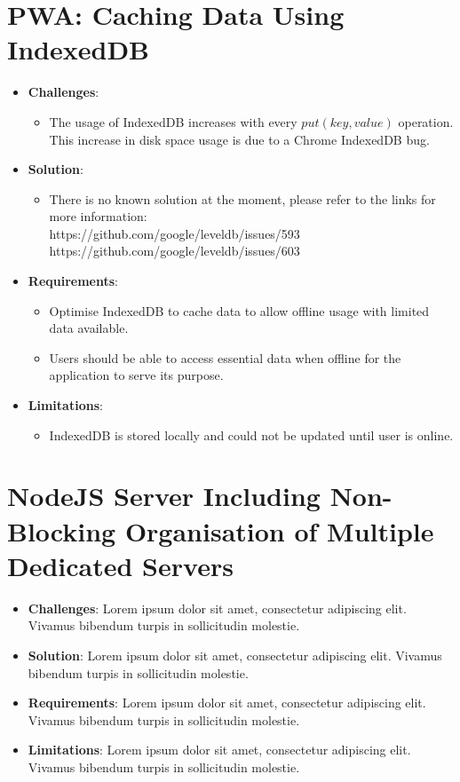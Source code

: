 \documentclass[11pt, a4paper]{article}
\begin{document}
\section{PWA: Caching Data Using IndexedDB}
\begin{itemize}
  \item \textbf{Challenges}:
  \begin{itemize}
    \item The usage of IndexedDB increases with every $put(key, value)$ operation. This increase in 
    disk space usage is due to a Chrome IndexedDB bug. 
  \end{itemize}
  \item \textbf{Solution}:
  \begin{itemize}
    \item There is no known solution at the moment, please refer to the links for more information:\\
    https://github.com/google/leveldb/issues/593\\
    https://github.com/google/leveldb/issues/603
  \end{itemize}
  \item \textbf{Requirements}:
  \begin{itemize}
    \item Optimise IndexedDB to cache data to allow offline usage with limited data available.
    \item Users should be able to access essential data when offline for the application to serve its 
    purpose.
  \end{itemize}
  \item \textbf{Limitations}: 
  \begin{itemize}
    \item IndexedDB is stored locally and could not be updated until user is online.
  \end{itemize}
\end{itemize}

\section{NodeJS Server Including Non-Blocking Organisation of Multiple Dedicated Servers}
\begin{itemize}
  \item \textbf{Challenges}: Lorem ipsum dolor sit amet, consectetur adipiscing elit. Vivamus
  bibendum turpis in sollicitudin molestie.
  \item \textbf{Solution}: Lorem ipsum dolor sit amet, consectetur adipiscing elit. Vivamus bibendum
  turpis in sollicitudin molestie.
  \item \textbf{Requirements}: Lorem ipsum dolor sit amet, consectetur adipiscing elit. Vivamus
  bibendum turpis in sollicitudin molestie.
  \item \textbf{Limitations}: Lorem ipsum dolor sit amet, consectetur adipiscing elit. Vivamus
  bibendum turpis in sollicitudin molestie.
\end{itemize}
\end{document}
